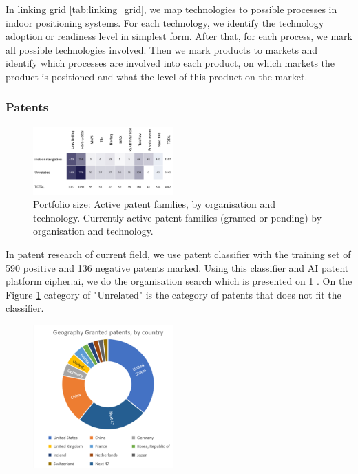 In linking grid \ref{tab:linking_grid}, we map technologies to possible processes in indoor positioning systems. For each technology, we identify the technology adoption or readiness level in simplest form. After that, for each process, we mark all possible technologies involved. Then we mark products to markets and identify which processes are involved into each product, on which markets the product is positioned and what the level of this product on the market. 


\subsubsection{Patents}

\begin{figure}[h]
    \centering
    \includegraphics[width=0.48\textwidth]{img/patents/Patenting2.png}
    \caption{Portfolio size: Active patent families, by organisation and technology. Currently active patent families (granted or pending) by organisation and technology.}
    \label{fig:Patent-families2}
\end{figure}

In patent research of current field, we use patent classifier with the training set of 590 positive and 136 negative patents marked.
Using this classifier and AI patent platform cipher.ai, we do the organisation search which is presented on \ref{fig:Patent-families2}
. On the Figure \ref{fig:Patent-families2} category of "Unrelated" is the category of patents that does not fit the classifier.

\begin{figure}[h]
    \centering
    \includegraphics[width=0.48\textwidth]{img/patents/Granted patents by country and organisation.png}
    \caption{}
    \label{fig:Patent-u}
\end{figure}



